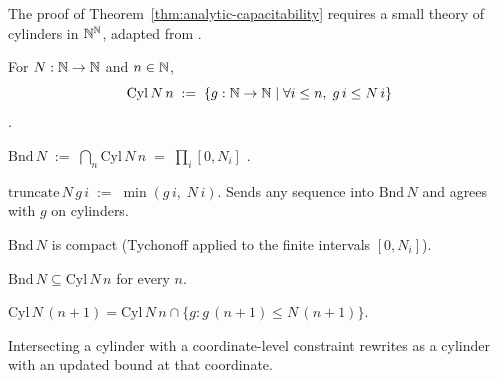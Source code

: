 The proof of Theorem~\ref{thm:analytic-capacitability} requires a
small theory of cylinders in $\mathbb{N}^{\mathbb{N}}$, adapted from
\cite[\S7.A]{kechris1995classical}.

\begin{defn}[Cylinder]
\label{def:cyl}
  \leanok
For $N : \mathbb{N} \to \mathbb{N}$ and $n \in \mathbb{N}$,
\[
  \mathrm{Cyl}\,N\,n \;:=\; \{ g : \mathbb{N} \to \mathbb{N} \mid \forall i \le n,\; g\,i \le N\,i \}
\]
\cite[\S7.A]{kechris1995classical}.
\end{defn}

\begin{defn}
\label{def:bnd}
  \leanok
$\mathrm{Bnd}\,N \;:=\; \bigcap_n \mathrm{Cyl}\,N\,n \;=\; \prod_i [0, N_i]$
\cite[\S7.A]{kechris1995classical}.
\end{defn}

\begin{defn}
\label{def:truncate}
  \leanok
$\mathrm{truncate}\,N\,g\,i \;:=\; \min(g\,i,\; N\,i)$. Sends any
sequence into $\mathrm{Bnd}\,N$ and agrees with $g$ on cylinders.
\end{defn}

\begin{lemma}
\label{lem:isCompact-bnd}
  \leanok
$\mathrm{Bnd}\,N$ is compact (Tychonoff applied to the finite
intervals $[0, N_i]$).
\end{lemma}

\begin{lemma}
\label{lem:bnd-subset-cyl}
  \leanok
$\mathrm{Bnd}\,N \subseteq \mathrm{Cyl}\,N\,n$ for every $n$.
\end{lemma}

\begin{lemma}
\label{lem:cyl-succ-eq}
  \leanok
$\mathrm{Cyl}\,N\,(n+1) = \mathrm{Cyl}\,N\,n \cap \{g : g\,(n+1) \le N\,(n+1)\}$.
\end{lemma}

\begin{lemma}
\label{lem:cyl-inter-update}
  \leanok
Intersecting a cylinder with a coordinate-level constraint rewrites
as a cylinder with an updated bound at that coordinate.
\end{lemma}

